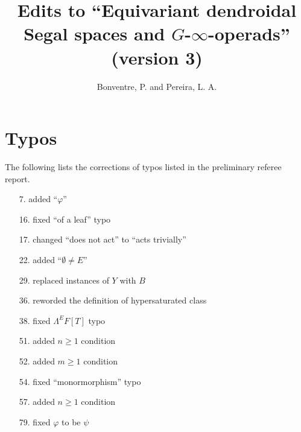 \documentclass{article}
\begin{document}
 
 
\title{Edits to ``Equivariant dendroidal Segal spaces and $G$-$\infty$-operads'' (version 3)
\\[12pt]} %
 
\author{Bonventre, P. and Pereira, L. A.}
 
\maketitle
 
 
 
 
\section{Typos}
 
The following lists the corrections of typos listed in the preliminary referee report.

\begin{itemize}
\item[7.] added ``$\varphi$''
\item[16.] fixed ``of a leaf'' typo
\item[17.] changed ``does not act'' to ``acts trivially''
\item[22.] added ``$\emptyset \neq E$''
\item[29.] replaced instances of $Y$ with $B$
\item[36.] reworded the definition of hypersaturated class
\item[38.] fixed $\Lambda^EF[T]$ typo
\item[51.] added $n \geq 1$ condition
\item[52.] added $m \geq 1$ condition
\item[54.] fixed ``monormorphism'' typo
\item[57.] added $n \geq 1$ condition
\item[79.] fixed $\varphi$ to be $\psi$
\end{itemize}
\end{document}
